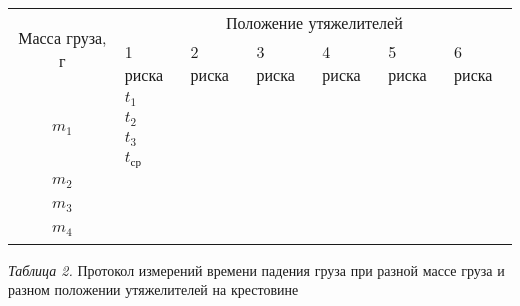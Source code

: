 \begin{center}
    \begin{tabular}{|c|p{1.8cm}|p{1.8cm}|p{1.8cm}|p{1.8cm}|p{1.8cm}|p{1.8cm}|}
        \hline
        \multirow{2}{*}{Масса груза, г} & \multicolumn{6}{c|}{Положение утяжелителей} \\
        \cline{2-7}
        & 1 риска       & 2 риска & 3 риска & 4 риска & 5 риска & 6 риска \\
        \hline
        \multirow{4}{*}{$m_1$} & $t_1$         &         &         &         &         &         \\
        \cline{2-7}
        & $t_2$         &         &         &         &         &         \\
        \cline{2-7}
        & $t_3$         &         &         &         &         &         \\
        \cline{2-7}
        & $t_\text{ср}$ &         &         &         &         &         \\
        \hline
        \multirow{4}{*}{$m_2$} &               &         &         &         &         &         \\
        \cline{2-7}
        &               &         &         &         &         &         \\
        \cline{2-7}
        &               &         &         &         &         &         \\
        \cline{2-7}
        &               &         &         &         &         &         \\
        \hline
        \multirow{4}{*}{$m_3$} &               &         &         &         &         &         \\
        \cline{2-7}
        &               &         &         &         &         &         \\
        \cline{2-7}
        &               &         &         &         &         &         \\
        \cline{2-7}
        &               &         &         &         &         &         \\
        \hline
        \multirow{4}{*}{$m_4$} &               &         &         &         &         &         \\
        \cline{2-7}
        &               &         &         &         &         &         \\
        \cline{2-7}
        &               &         &         &         &         &         \\
        \cline{2-7}
        &               &         &         &         &         &         \\
        \hline

    \end{tabular}

    \smallvspace

    \textit{Таблица 2.} Протокол измерений времени падения груза при разной
    массе груза и разном положении утяжелителей на крестовине
\end{center}